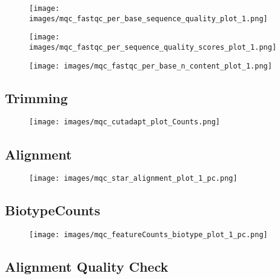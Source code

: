 \documentclass{article}
\begin{document}
\begin{figure}[h]
\centering
\texttt{[image: images/mqc\_fastqc\_per\_base\_sequence\_quality\_plot\_1.png]}
\caption[Sequence Quality Histogram]{}
\end{figure}
\FloatBarrier

\begin{figure}[h]
\centering
\texttt{[image: images/mqc\_fastqc\_per\_sequence\_quality\_scores\_plot\_1.png]}
\caption[Per Sequence Quality Scores]{}
\end{figure}
\FloatBarrier

\begin{figure}[h]
\centering
\texttt{[image: images/mqc\_fastqc\_per\_base\_n\_content\_plot\_1.png]}
\caption[Per Base N Content]{}
\end{figure}
\FloatBarrier

\subsection*{Trimming}

\begin{figure}[h]
\centering
\texttt{[image: images/mqc\_cutadapt\_plot\_Counts.png]}
\caption[Lengths of Trimmed Sequences]{}
\end{figure}
\FloatBarrier

\newpage
\subsection*{Alignment}

\begin{figure}[h]
\centering
\texttt{[image: images/mqc\_star\_alignment\_plot\_1\_pc.png]}
\caption[Alignment Sequences]{}
\end{figure}
\FloatBarrier

\newpage
\subsection*{BiotypeCounts}

\begin{figure}[h]
\centering
\texttt{[image: images/mqc\_featureCounts\_biotype\_plot\_1\_pc.png]}
\caption[Biotype Counts]{}
\end{figure}
\FloatBarrier

\newpage
\subsection*{Alignment Quality Check}
\end{document}
